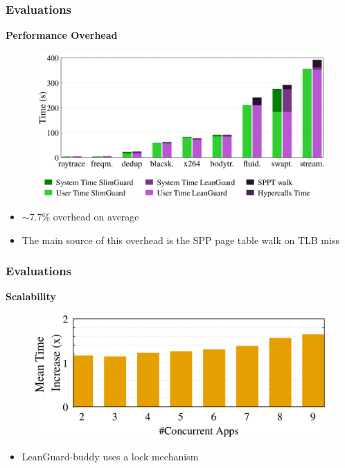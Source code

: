 \documentclass[xcolor=table,bigger,unknownkeysallowed]{beamer}
\begin{document}
\begin{frame}
	\frametitle{Evaluations} 
	\textbf{Performance Overhead}\\
	\begin{figure}
		\centering
		\includegraphics[width=.5\columnwidth]{fig/perf_overhead.png}
	\end{figure}	
	\begin{itemize}
		\item $\sim$7.7\% overhead on average
		\item The main source of this overhead is the SPP page table walk on TLB miss
	\end{itemize}
\end{frame}
\begin{frame}
	\frametitle{Evaluations} 
	\textbf{Scalability}\\
	\begin{figure}
		\centering
		\includegraphics[width=.5\columnwidth]{fig/concurrency.png}
	\end{figure}	
	\begin{itemize}
		\item LeanGuard-buddy uses a lock mechanism
	\end{itemize}
\end{frame}
\end{document}
